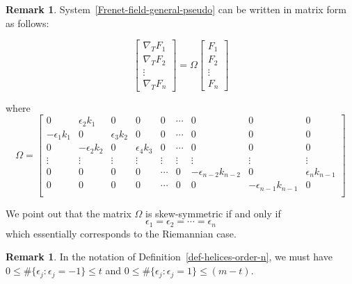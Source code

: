 \documentclass[11pt]{amsart}
\theoremstyle{plain}
\theoremstyle{definition}
\newtheorem{remark}       [theorem]  {Remark}
\numberwithin{equation}{section}
\begin{document}
\begin{remark}\label{remark-not-skew}
System~\ref{Frenet-field-general-pseudo} can be written in matrix form as follows:

\[
\begin{bmatrix}
\nabla_T F_1\\
\nabla_T F_2\\
\vdots\\
\nabla_T F_n
\end{bmatrix}
=
\Omega
\begin{bmatrix}
 F_1\\
 F_2\\
\vdots\\
 F_n
\end{bmatrix}
\]

where
{\small
\[
\Omega=\begin{bmatrix}
0&\epsilon_2 k_1&0&0&0&\cdots&0&0&0\\
-\epsilon_1 k_1&0&\epsilon_3 k_2&0&0&\cdots&0&0&0\\
0&-\epsilon_2 k_2&0&\epsilon_4 k_3&0&\cdots&0&0&0\\
\vdots&\vdots&\vdots&\vdots&\vdots&\vdots&\vdots&\vdots&\vdots\\
0&0&0&0&\cdots&0&-\epsilon_{n-2} k_{n-2}&0&\epsilon_{n} k_{n-1}\\
0&0&0&0&\cdots&0&0&-\epsilon_{n-1} k_{n-1}&0\\
\end{bmatrix}
\]
}\vspace{2mm}

We point out that the matrix $\Omega$ is skew-symmetric if and only if
\[
\epsilon_1=\epsilon_2=\cdots=\epsilon_n
\]
which essentially corresponds to the Riemannian case.
\end{remark}

\begin{remark} In the notation of Definition~\ref{def-helices-order-n}, we must have $0\leq \#\{\epsilon_j \colon \epsilon_j=-1 \}\leq t$ and $0\leq \#\{\epsilon_j \colon \epsilon_j=1 \}\leq (m-t)$.
\end{remark}
\end{document}
